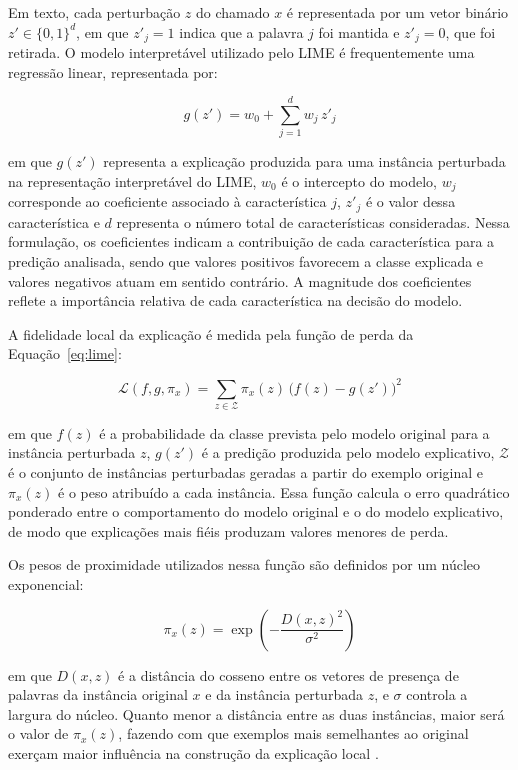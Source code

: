 \documentclass[
    12pt,                %
    openright,           %
    oneside,             %
    a4paper,             %
    english,             %
    brazil               %
]{abntex2}
\begin{document}
Em texto, cada perturbação $z$ do chamado $x$ é representada por um vetor binário $z' \in \{0,1\}^d$, em que $z'_j = 1$ indica que a palavra $j$ foi mantida e $z'_j = 0$, que foi retirada. O modelo interpretável utilizado pelo LIME é frequentemente uma regressão linear, representada por:

\begin{equation}
g(z') = w_0 + \sum_{j=1}^{d} w_j\, z'_j
\label{eq:lime-g}
\end{equation}

em que $g(z')$ representa a explicação produzida para uma instância perturbada na representação interpretável do LIME, $w_0$ é o intercepto do modelo, $w_j$ corresponde ao coeficiente associado à característica $j$, $z'_j$ é o valor dessa característica e $d$ representa o número total de características consideradas. Nessa formulação, os coeficientes indicam a contribuição de cada característica para a predição analisada, sendo que valores positivos favorecem a classe explicada e valores negativos atuam em sentido contrário. A magnitude dos coeficientes reflete a importância relativa de cada característica na decisão do modelo.

A fidelidade local da explicação é medida pela função de perda da Equação~\ref{eq:lime}:

\begin{equation}
\mathcal{L}(f, g, \pi_x) = \sum_{z \in \mathcal{Z}} \pi_x(z)\, \big( f(z) - g(z') \big)^2
\label{eq:lime-perda}
\end{equation}

em que $f(z)$ é a probabilidade da classe prevista pelo modelo original para a instância perturbada $z$, $g(z')$ é a predição produzida pelo modelo explicativo, $\mathcal{Z}$ é o conjunto de instâncias perturbadas geradas a partir do exemplo original e $\pi_x(z)$ é o peso atribuído a cada instância. Essa função calcula o erro quadrático ponderado entre o comportamento do modelo original e o do modelo explicativo, de modo que explicações mais fiéis produzam valores menores de perda.

Os pesos de proximidade utilizados nessa função são definidos por um núcleo exponencial:

\begin{equation}
\pi_x(z) = \exp\!\left( -\frac{D(x,z)^2}{\sigma^2} \right)
\label{eq:lime-nucleo}
\end{equation}

em que $D(x,z)$ é a distância do cosseno entre os vetores de presença de palavras da instância original $x$ e da instância perturbada $z$, e $\sigma$ controla a largura do núcleo. Quanto menor a distância entre as duas instâncias, maior será o valor de $\pi_x(z)$, fazendo com que exemplos mais semelhantes ao original exerçam maior influência na construção da explicação local \cite{ribeiro2016}.
\end{document}
